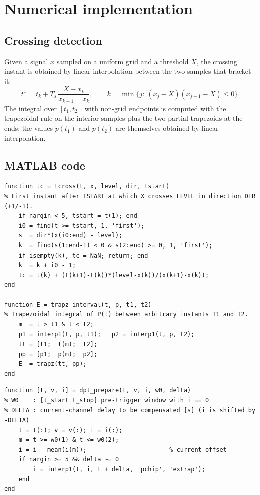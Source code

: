 \documentclass[11pt,a4paper]{article}
\begin{document}
\section{Numerical implementation}

\subsection{Crossing detection}

Given a signal $x$ sampled on a uniform grid and a threshold $X$, the crossing instant is
obtained by linear interpolation between the two samples that bracket it:
\begin{equation}
t^\star = t_k + T_s\,\frac{X-x_k}{x_{k+1}-x_k},\qquad
k=\min\{j:\ (x_j-X)(x_{j+1}-X)\le 0\}.
\end{equation}
The integral over $[t_1,t_2]$ with non-grid endpoints is computed with the trapezoidal
rule on the interior samples plus the two partial trapezoids at the ends; the values
$p(t_1)$ and $p(t_2)$ are themselves obtained by linear interpolation.

\subsection{MATLAB code}

\begin{lstlisting}[caption={Utility functions: threshold crossing and interpolated integral.}]
function tc = tcross(t, x, level, dir, tstart)
% First instant after TSTART at which X crosses LEVEL in direction DIR (+1/-1).
    if nargin < 5, tstart = t(1); end
    i0 = find(t >= tstart, 1, 'first');
    s  = dir*(x(i0:end) - level);
    k  = find(s(1:end-1) < 0 & s(2:end) >= 0, 1, 'first');
    if isempty(k), tc = NaN; return; end
    k  = k + i0 - 1;
    tc = t(k) + (t(k+1)-t(k))*(level-x(k))/(x(k+1)-x(k));
end

function E = trapz_interval(t, p, t1, t2)
% Trapezoidal integral of P(t) between arbitrary instants T1 and T2.
    m  = t > t1 & t < t2;
    p1 = interp1(t, p, t1);   p2 = interp1(t, p, t2);
    tt = [t1;  t(m);  t2];
    pp = [p1;  p(m);  p2];
    E  = trapz(tt, pp);
end
\end{lstlisting}

\begin{lstlisting}[caption={Pre-processing: offset removal and deskew.}]
function [t, v, i] = dpt_prepare(t, v, i, w0, delta)
% W0    : [t_start t_stop] pre-trigger window with i == 0
% DELTA : current-channel delay to be compensated [s] (i is shifted by -DELTA)
    t = t(:); v = v(:); i = i(:);
    m = t >= w0(1) & t <= w0(2);
    i = i - mean(i(m));                       % current offset
    if nargin >= 5 && delta ~= 0
        i = interp1(t, i, t + delta, 'pchip', 'extrap');
    end
end
\end{lstlisting}
\end{document}
